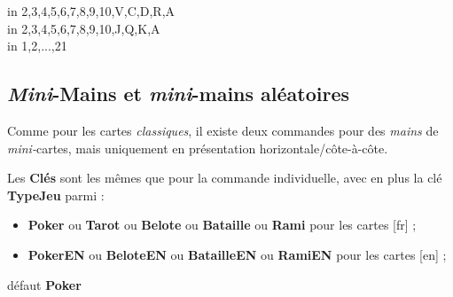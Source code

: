 \documentclass[a4paper]{article}
\newcommand\cmaj[1]{\tcbox[vignetteMaJ]{#1}\xspace}
\newcommand\Cle[1]{{\bfseries\sffamily\textlangle #1\textrangle}}
\begin{document}
\begin{codetex}[]
\foreach \EECARTE in {2,3,4,5,6,7,8,9,10,V,C,D,R,A}{}\\
\foreach \EECARTE in {2,3,4,5,6,7,8,9,10,J,Q,K,A}{}\\
%
\foreach \EECARTE in {1,2,...,21}{}
\end{codetex}

\subsection{\textit{Mini}-Mains et \textit{mini}-mains aléatoires}

\begin{codeidee}
Comme pour les cartes \textit{classiques}, il existe deux commandes pour des \textit{mains} de \textit{mini-}cartes, mais uniquement en présentation horizontale/côte-à-côte.
\end{codeidee}

\begin{codetex}

\end{codetex}

\begin{codecles}
Les \Cle{Clés} sont les mêmes que pour la commande individuelle, avec en plus la clé \Cle{TypeJeu} parmi :
\begin{itemize}
	\item \Cle{Poker} ou \Cle{Tarot} ou \Cle{Belote} ou \Cle{Bataille} ou \Cle{Rami} pour les cartes [fr] ;
	\item \cmaj{0.2.5} \Cle{PokerEN} ou \Cle{BeloteEN} ou \Cle{BatailleEN} ou \Cle{RamiEN} pour les cartes [en] ;
\end{itemize}
\hfill{}défaut \Cle{Poker}
\end{codecles}
\end{document}
